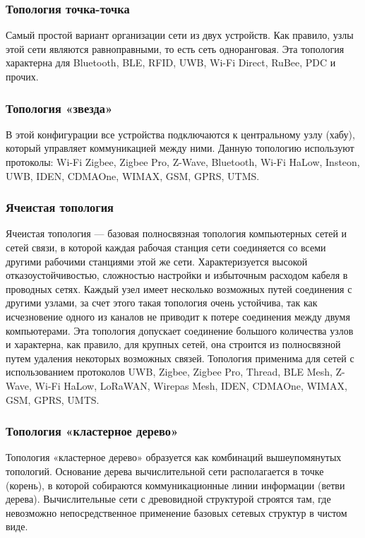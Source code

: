 \documentclass[14pt,a4paper]{extarticle}
\begin{document}
\subsubsection{Топология точка-точка}
Самый простой вариант организации сети из двух устройств. Как правило, узлы этой сети являются равноправными, то есть сеть одноранговая.
Эта топология характерна для Bluetooth, BLE, RFID, UWB, Wi-Fi Direct, RuBee, PDC и прочих.

\subsubsection{Топология «звезда»}
В этой конфигурации все устройства подключаются к центральному узлу (хабу), который управляет коммуникацией между ними.
Данную топологию используют протоколы: Wi-Fi Zigbee, Zigbee Pro, Z-Wave, Bluetooth, Wi-Fi HaLow, Insteon, UWB, IDEN, CDMAOne, WIMAX, GSM, GPRS, UTMS.

\subsubsection{Ячеистая топология}
Ячеистая топология — базовая полносвязная топология компьютерных сетей и сетей связи, в которой каждая рабочая станция сети соединяется со всеми другими рабочими станциями этой же сети. Характеризуется высокой отказоустойчивостью, сложностью настройки и избыточным расходом кабеля в проводных сетях. Каждый узел имеет несколько возможных путей соединения с другими узлами, за счет этого такая топология очень устойчива, так как исчезновение одного из каналов не приводит к потере соединения между двумя компьютерами. Эта топология допускает соединение большого количества узлов и характерна, как правило, для крупных сетей, она строится из полносвязной путем удаления некоторых возможных связей.
Топология применима для сетей с использованием протоколов UWB, Zigbee, Zigbee Pro, Thread, BLE Mesh, Z-Wave, Wi-Fi HaLow, LoRaWAN, Wirepas Mesh, IDEN, CDMAOne, WIMAX, GSM, GPRS, UMTS.

\subsubsection{Топология «кластерное дерево»}
Топология «кластерное дерево» образуется как комбинаций вышеупомянутых топологий. Основание дерева вычислительной сети располагается в точке (корень), в которой собираются
коммуникационные линии информации (ветви дерева). Вычислительные сети с древовидной структурой строятся там, где невозможно непосредственное применение базовых сетевых структур в
чистом виде.
\end{document}
